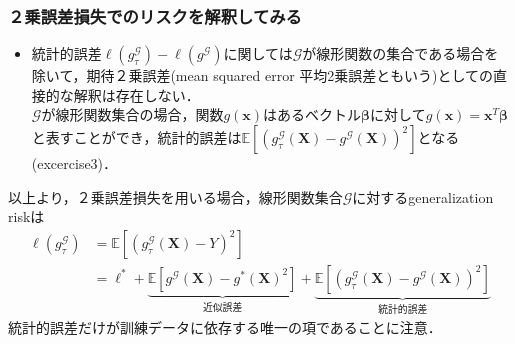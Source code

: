 \documentclass[dvipdfmx,cjk]{beamer}
\theoremstyle{example}
\begin{document}
\begin{frame}
    \frametitle{２乗誤差損失でのリスクを解釈してみる}
    \begin{itemize}
        \item 統計的誤差$\ell(g^\mathcal{G}_\tau)-\ell(g^\mathcal{G})$に関しては$\mathcal{G}$が線形関数の集合である場合を除いて，期待２乗誤差(mean squared error 平均2乗誤差ともいう)としての直接的な解釈は存在しない．\\
              $\mathcal{G}$が線形関数集合の場合，関数$g(\boldsymbol{x})$はあるベクトル$\boldsymbol{\beta}$に対して$g(\boldsymbol{x})=\boldsymbol{x}^T\boldsymbol{\beta}$と表すことができ，統計的誤差は$\mathbb{E}\left[(g^\mathcal{G}_\tau(\boldsymbol{X})-g^\mathcal{G}(\boldsymbol{X}))^2\right]$となる(excercise3)．
    \end{itemize}
    以上より，２乗誤差損失を用いる場合，線形関数集合$\mathcal{G}$に対するgeneralization riskは
    \begin{align*}
        \ell(g^\mathcal{G}_\tau) & =\mathbb{E}\left[(g^\mathcal{G}_\tau(\boldsymbol{X})-Y)^2\right] \\&=\ell^*+\underbrace{\mathbb{E}\left[g^\mathcal{G}(\boldsymbol{X})-g^*(\boldsymbol{X})^2\right]}_\text{近似誤差}+\underbrace{\mathbb{E}\left[(g^\mathcal{G}_\tau(\boldsymbol{X})-g^\mathcal{G}(\boldsymbol{X}))^2\right]}_\text{統計的誤差}
    \end{align*}
    統計的誤差だけが訓練データに依存する唯一の項であることに注意．
\end{frame}
\end{document}
